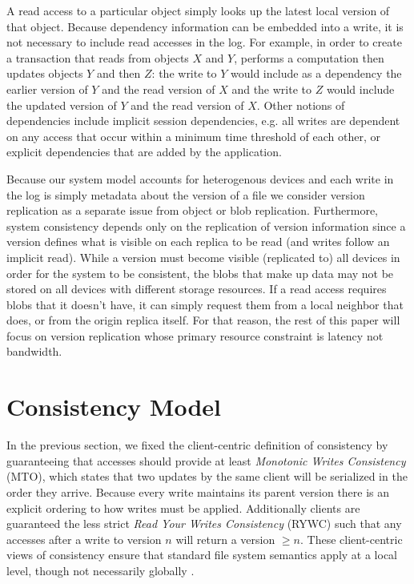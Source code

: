 \documentclass[10pt,conference,compsocconf,letterpaper]{IEEEtran}
\begin{document}
A read access to a particular object simply looks up the latest local version of that object. Because dependency information can be embedded into a write, it is not necessary to include read accesses in the log. For example, in order to create a transaction that reads from objects $X$ and $Y$, performs a computation then updates objects $Y$ and then $Z$: the write to $Y$ would include as a dependency the earlier version of $Y$ and the read version of $X$ and the write to $Z$ would include the updated version of $Y$ and the read version of $X$. Other notions of dependencies include implicit session dependencies, e.g. all writes are dependent on any access that occur within a minimum time threshold of each other, or explicit dependencies that are added by the application.

Because our system model accounts for heterogenous devices and each write in the log is simply metadata about the version of a file we consider version replication as a separate issue from object or blob replication. Furthermore, system consistency depends only on the replication of version information since a version defines what is visible on each replica to be read (and writes follow an implicit read). While a version must become visible (replicated to) all devices in order for the system to be consistent, the blobs that make up data may not be stored on all devices with different storage resources. If a read access requires blobs that it doesn't have, it can simply request them from a local neighbor that does, or from the origin replica itself. For that reason, the rest of this paper will focus on version replication whose primary resource constraint is latency not bandwidth.

\section{Consistency Model}

In the previous section, we fixed the client-centric definition of consistency by guaranteeing that accesses should provide at least \textit{Monotonic Writes Consistency} (MTO), which states that two updates by the same client will be serialized in the order they arrive. Because every write maintains its parent version there is an explicit ordering to how writes must be applied. Additionally clients are guaranteed the less strict \textit{Read Your Writes Consistency} (RYWC) such that any accesses after a write to version $n$ will return a version $\geq n$. These client-centric views of consistency ensure that standard file system semantics apply at a local level, though not necessarily globally \cite{bermbach_consistency_2013}.
\end{document}
